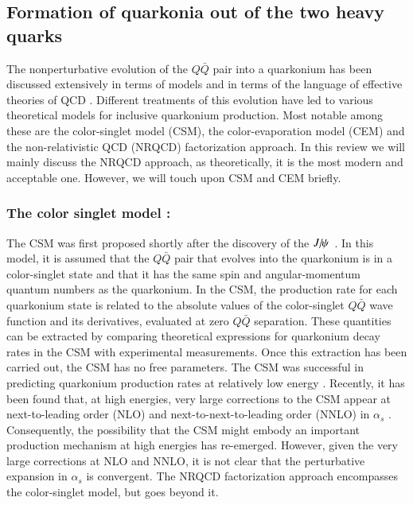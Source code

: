 \documentclass[review]{elsarticle}
\newcommand{\Jpsi}{\ensuremath{J\hspace{-.08em}/\hspace{-.14em}\psi}\xspace} %
\begin{document}
\subsection{Formation of quarkonia out of the two heavy quarks}
\label{subsec:QuarkoniaProdFromHeavyQuarks}

The nonperturbative evolution of the $Q\bar Q$ pair into a quarkonium
has been discussed extensively in terms of models and in terms of the
language of effective theories of QCD
\cite{Bodwin:1994jh,Brambilla:2004wf}. Different
treatments of this evolution have led to various theoretical models for
inclusive quarkonium production. Most notable among these are the color-singlet
model (CSM), the color-evaporation model (CEM) and the non-relativistic QCD
(NRQCD) factorization approach. In this review we will mainly discuss the NRQCD 
approach, as theoretically, it is the most modern and acceptable one. However,
we will touch upon CSM and CEM briefly. 


\subsubsection{The color singlet model : }

The CSM was first proposed shortly after the discovery of the 
$\Jpsi$~\cite{Einhorn:1975ua,Ellis:1976fj,Carlson:1976cd,Berger:1980ni}.
In this model, it is assumed that the $Q\bar Q$ pair that evolves into
the quarkonium is in a color-singlet state and that it has the same spin
and angular-momentum quantum numbers as the quarkonium. In the CSM, the
production rate for each quarkonium state is related to the absolute
values of the color-singlet $Q\bar Q$ wave function and its derivatives,
evaluated at zero $Q\bar Q$ separation. These quantities can be
extracted by comparing theoretical expressions for quarkonium decay
rates in the CSM with experimental measurements. Once this extraction
has been carried out, the CSM has no free parameters. The CSM was
successful in predicting quarkonium production rates at relatively low
energy \cite{Schuler:1994hy}. Recently, it has been found that, at high
energies, very large corrections to the CSM appear at next-to-leading
order (NLO) and next-to-next-to-leading order (NNLO) in $\alpha_s$
\cite{Artoisenet:2007xi,Campbell:2007ws,Artoisenet:2008fc}.
Consequently, the possibility that the CSM might embody an important 
production mechanism at high energies has re-emerged. 
However, given the very large corrections at
NLO and NNLO, it is not clear that the perturbative expansion in
$\alpha_s$ is convergent. 
The NRQCD factorization approach encompasses
the color-singlet model, but goes beyond it.
\end{document}

